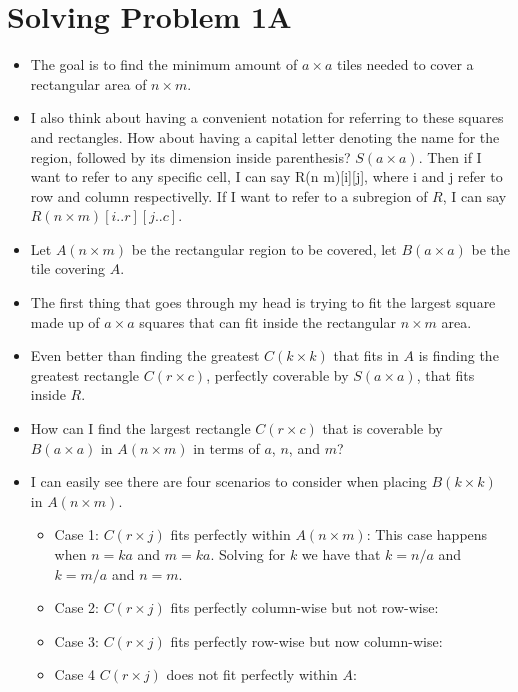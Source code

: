 \documentclass[12pt]{article}
\begin{document}
    \section*{Solving Problem 1A}
    \begin{itemize}
        \item The goal is to find the minimum amount of $a \times a$ tiles needed to cover a rectangular area of $n \times m$.
        \item I also think about having a convenient notation for referring to these squares and rectangles. How about having a capital letter denoting the name for the region, followed by its dimension inside parenthesis? $S(a \times a)$. Then if I want to refer to any specific cell, I can say R(n \times m)[i][j], where i and j refer to row and column respectivelly. If I want to refer to a subregion of $R$, I can say $R(n \times m)[i..r][j..c]$.
        \item Let $A(n\times m)$ be the rectangular region to be covered, let $B(a\times a)$ be the tile covering $A$.
        \item The first thing that goes through my head is trying to fit the largest square made up of $a \times a$ squares that can fit inside the rectangular $n \times m$ area.
        \item Even better than finding the greatest $C(k\times k)$ that fits in $A$ is finding the greatest rectangle $C(r\times c)$, perfectly coverable by $S(a \times a)$, that fits inside $R$.
        \item How can I find the largest rectangle $C(r \times c)$ that is coverable by $B(a \times a)$ in $A(n \times m)$ in terms of $a$, $n$, and $m$?
        \item I can easily see there are four scenarios to consider when placing $B(k \times k)$ in $A(n \times m)$. 
            \begin{itemize}
            \item Case 1: $C(r \times j)$ fits perfectly within $A(n \times m)$: This case happens when $n = ka$ and $m = ka$. Solving for $k$ we have that $k=n/a$ and $k=m/a$ and $n=m$.
            \item Case 2: $C(r \times j)$ fits perfectly column-wise but not row-wise:
            \item Case 3: $C(r \times j)$ fits perfectly row-wise but now column-wise:
            \item Case 4 $C(r \times j)$ does not fit perfectly within $A$:
            \end{itemize}
        
    \end{itemize}
\end{document}
